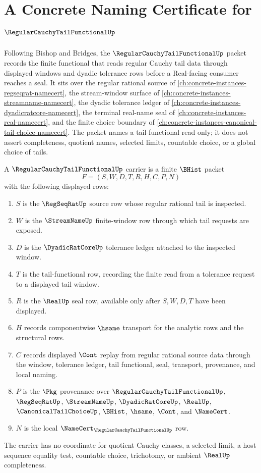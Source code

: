 \chapter{A Concrete Naming Certificate for $\RegularCauchyTailFunctionalUp$}
\label{ch:concrete-instances-regular-cauchy-tail-functional-namecert}

Following Bishop and Bridges, the $\RegularCauchyTailFunctionalUp$ packet records the finite functional that reads regular Cauchy tail data through displayed windows and dyadic tolerance rows before a Real-facing consumer reaches a seal. It sits over the regular rational source of \autoref{ch:concrete-instances-regseqrat-namecert}, the stream-window surface of \autoref{ch:concrete-instances-streamname-namecert}, the dyadic tolerance ledger of \autoref{ch:concrete-instances-dyadicratcore-namecert}, the terminal real-name seal of \autoref{ch:concrete-instances-real-namecert}, and the finite choice boundary of \autoref{ch:concrete-instances-canonical-tail-choice-namecert}. The packet names a tail-functional read only; it does not assert completeness, quotient names, selected limits, countable choice, or a global choice of tails.

\begin{definition}
\label{def:regular-cauchy-tail-functional-carrier}
A $\RegularCauchyTailFunctionalUp$ carrier is a finite $\BHist$ packet
$$
F=(S,W,D,T,R,H,C,P,N)
$$
with the following displayed rows:
\begin{enumerate}
\item $S$ is the $\RegSeqRatUp$ source row whose regular rational tail is inspected.
\item $W$ is the $\StreamNameUp$ finite-window row through which tail requests are exposed.
\item $D$ is the $\DyadicRatCoreUp$ tolerance ledger attached to the inspected window.
\item $T$ is the tail-functional row, recording the finite read from a tolerance request to a displayed tail window.
\item $R$ is the $\RealUp$ seal row, available only after $S,W,D,T$ have been displayed.
\item $H$ records componentwise $\hsame$ transport for the analytic rows and the structural rows.
\item $C$ records displayed $\Cont$ replay from regular rational source data through the window, tolerance ledger, tail functional, seal, transport, provenance, and local naming.
\item $P$ is the $\Pkg$ provenance over $\RegularCauchyTailFunctionalUp$, $\RegSeqRatUp$, $\StreamNameUp$, $\DyadicRatCoreUp$, $\RealUp$, $\CanonicalTailChoiceUp$, $\BHist$, $\hsame$, $\Cont$, and $\NameCert$.
\item $N$ is the local $\NameCert_{\RegularCauchyTailFunctionalUp}$ row.
\end{enumerate}
The carrier has no coordinate for quotient Cauchy classes, a selected limit, a host sequence equality test, countable choice, trichotomy, or ambient $\RealUp$ completeness.
\end{definition}

